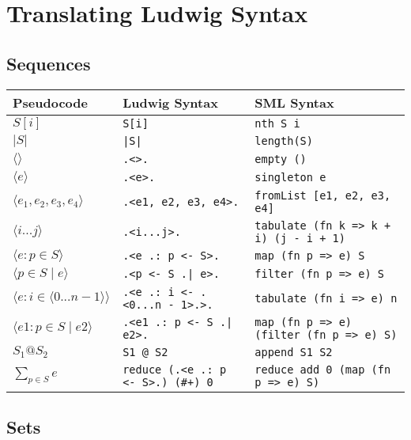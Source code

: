 \section{Translating Ludwig Syntax}

\subsection{Sequences}

\begin{tabular}{| l l l |}
\hline
\textbf{Pseudocode} & \textbf{Ludwig Syntax} & \textbf{SML Syntax}\\
\hline
$S[i]$ & \verb"S[i]" & \verb"nth S i"\\
$|S|$ & \verb"|S|" & \verb"length(S)"\\
$\langle \rangle$ & \verb".<>." & \verb"empty ()"\\
$\langle e \rangle$ & \verb".<e>." & \verb"singleton e"\\
$\langle e_1, e_2, e_3, e_4 \rangle$ & \verb".<e1, e2, e3, e4>." & \verb"fromList [e1, e2, e3, e4]"\\
$\langle i...j \rangle$ & \verb".<i...j>." & \verb"tabulate (fn k => k + i) (j - i + 1)"\\
$\langle e : p \in S \rangle$ & \verb".<e .: p <- S>." & \verb"map (fn p => e) S"\\
$\langle p \in S \mid e \rangle$ & \verb".<p <- S .| e>." & \verb"filter (fn p => e) S"\\
$\langle e : i \in \langle 0...n - 1 \rangle \rangle$ & \verb".<e .: i <- .<0...n - 1>.>." & \verb"tabulate (fn i => e) n"\\
$\langle e1 : p \in S \mid e2 \rangle$ & \verb".<e1 .: p <- S .| e2>." & \verb"map (fn p => e) (filter (fn p => e) S)"\\
$S_1 @ S_2$ & \verb"S1 @ S2" & \verb"append S1 S2"\\
$\displaystyle \sum_{p \in S}{e}$ & \verb"reduce (.<e .: p <- S>.) (#+) 0" & \verb"reduce add 0 (map (fn p => e) S)"\\
\hline
\end{tabular}

\subsection{Sets}


